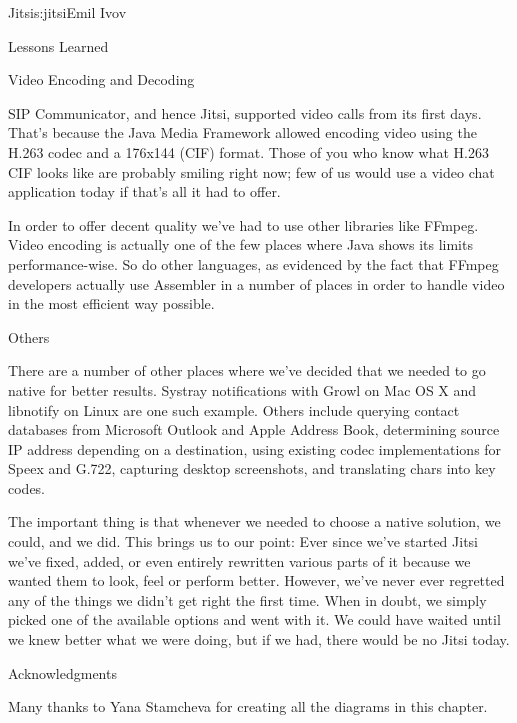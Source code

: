 \begin{aosachapter}{Jitsi}{s:jitsi}{Emil Ivov}
\begin{aosasect1}{Lessons Learned}
\begin{aosasect2}{Video Encoding and Decoding}

SIP Communicator, and hence Jitsi, supported video calls from its
first days. That's because the Java Media Framework allowed encoding
video using the H.263 codec and a 176x144 (CIF) format.  Those of you
who know what H.263 CIF looks like are probably smiling right now; few
of us would use a video chat application today if that's all it had to
offer.

In order to offer decent quality we've had to use other libraries like
FFmpeg. Video encoding is actually one of the few places where Java
shows its limits performance-wise. So do other languages, as evidenced
by the fact that FFmpeg developers actually use Assembler in a number
of places in order to handle video in the most efficient way possible.

\end{aosasect2}

\begin{aosasect2}{Others}

There are a number of other places where we've decided that we needed
to go native for better results. Systray notifications with Growl on
Mac OS X and libnotify on Linux are one such example. Others include
querying contact databases from Microsoft Outlook and Apple Address
Book, determining source IP address depending on a destination, using
existing codec implementations for Speex and G.722, capturing desktop
screenshots, and translating chars into key codes.

\end{aosasect2}

The important thing is that whenever we needed to choose a native
solution, we could, and we did. This brings us to our point: Ever
since we've started Jitsi we've fixed, added, or even entirely
rewritten various parts of it because we wanted them to look, feel or
perform better.  However, we've never ever regretted any of the things
we didn't get right the first time. When in doubt, we simply picked
one of the available options and went with it. We could have waited
until we knew better what we were doing, but if we had, there
would be no Jitsi today.

\end{aosasect1}

\begin{aosasect1}{Acknowledgments}

Many thanks to Yana Stamcheva for creating all the diagrams in this
chapter.

\end{aosasect1}

\end{aosachapter}
